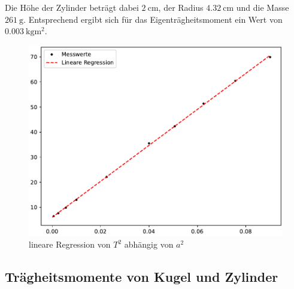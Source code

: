   Die Höhe der Zylinder beträgt dabei $\qty{2}{\centi\meter}$, der Radius $\qty{4,32}{\centi\meter}$ und die Masse $\qty{261}{\gram}$.
  Entsprechend ergibt sich für das Eigenträgheitsmoment ein Wert von $\qty{0.003}{\kilo\gram\meter\squared}$.

  \begin{figure}
    \centering
    \includegraphics{plot.pdf}
    \caption{lineare Regression von $T^2$ abhängig von $a^2$ }
    \label{fig:plot}
  \end{figure}

  

  \subsection{Trägheitsmomente von Kugel und Zylinder}

